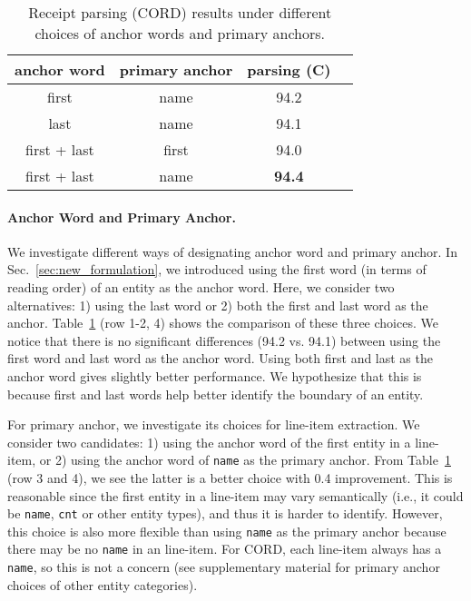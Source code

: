 \begin{table}[!t]
    \centering
    \begin{tabular}{cccc}
    \bf anchor word  &  \bf primary anchor & \bf parsing (C) \\
    \midrule
    first            &   name       &    94.2     \\
    last             &   name       &    94.1     \\
    first + last     &   first      &    94.0     \\
first + last     &   name      &  \bf{94.4}   \\
    \end{tabular}
    \vspace{-0.7em}
    \caption{Receipt parsing (CORD) results under different choices of anchor words and primary anchors.
    }
    \label{tab:anchor_word} \vspace{-1em}
\end{table}

\vspace{-1em}
\paragraph{Anchor Word and Primary Anchor.} We investigate different ways of designating anchor word and primary anchor. In Sec.~\ref{sec:new_formulation}, we introduced using the first word (in terms of reading order) of an entity as the anchor word. Here, we consider two alternatives: 1) using the last word or 2) both the first and last word as the anchor. Table~\ref{tab:anchor_word} (row 1-2, 4) shows the comparison of these three choices. We notice that there is no significant differences (94.2 vs. 94.1) between using the first word and last word as the anchor word. Using both first and last as the anchor word gives slightly better performance. We hypothesize that this is because first and last words help better identify the boundary of an entity.

For primary anchor, we investigate its choices for line-item extraction. We consider two candidates: 1) using the anchor word of the first entity in a line-item, or 2) using the anchor word of \texttt{name} as the primary anchor. From Table~\ref{tab:anchor_word} (row 3 and 4), we see the latter is a better choice with 0.4 improvement. This is reasonable since the first entity in a line-item may vary semantically (i.e., it could be \texttt{name}, \texttt{cnt} or other entity types), and thus it is harder to identify. However, this choice is also more flexible than using \texttt{name} as the primary anchor because there may be no \texttt{name} in an line-item. For CORD, each line-item always has a \texttt{name}, so this is not a concern (see supplementary material for primary anchor choices of other entity categories).

